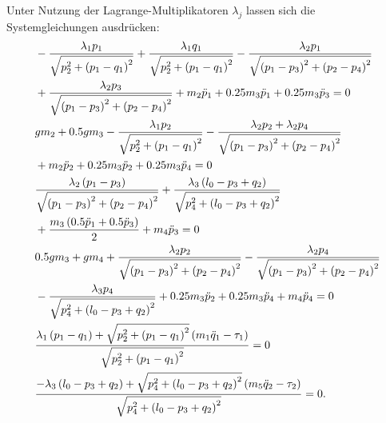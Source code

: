Unter Nutzung der Lagrange-Multiplikatoren $\lambda_j$ lassen sich die Systemgleichungen ausdrücken:
\begin{subequations}
	\begin{flalign}
		&- \frac{\lambda_{1} p_{1}}{\sqrt{p_{2}^{2} + \left(p_{1} - q_{1}\right)^{2}}} + \frac{\lambda_{1} q_{1}}{\sqrt{p_{2}^{2} + \left(p_{1} - q_{1}\right)^{2}}} - \frac{\lambda_{2} p_{1}}{\sqrt{\left(p_{1} - p_{3}\right)^{2} + \left(p_{2} - p_{4}\right)^{2}}} \nonumber \\
		&+ \frac{\lambda_{2} p_{3}}{\sqrt{\left(p_{1} - p_{3}\right)^{2} + \left(p_{2} - p_{4}\right)^{2}}} + m_{2} \ddot{p}_{1} + 0.25 m_{3} \ddot{p}_{1} + 0.25 m_{3} \ddot{p}_{3} = 0\\
		&g m_{2} + 0.5 g m_{3} - \frac{\lambda_{1} p_{2}}{\sqrt{p_{2}^{2} + \left(p_{1} - q_{1}\right)^{2}}} - \frac{\lambda_{2} p_{2} + \lambda_{2} p_{4}}{\sqrt{\left(p_{1} - p_{3}\right)^{2} + \left(p_{2} - p_{4}\right)^{2}}} \nonumber \\
		&+ m_{2} \ddot{p}_{2} + 0.25 m_{3} \ddot{p}_{2} + 0.25 m_{3} \ddot{p}_{4} = 0\\
		&\frac{\lambda_{2} \left(p_{1} - p_{3}\right)}{\sqrt{\left(p_{1} - p_{3}\right)^{2} + \left(p_{2} - p_{4}\right)^{2}}} + \frac{\lambda_{3} \left(l_{0} - p_{3} + q_{2}\right)}{\sqrt{p_{4}^{2} + \left(l_{0} - p_{3} + q_{2}\right)^{2}}} \noindent \\
		&+ \frac{m_{3} \left(0.5 \ddot{p}_{1} + 0.5 \ddot{p}_{3}\right)}{2} + m_{4} \ddot{p}_{3} = 0\\
		&0.5 g m_{3} + g m_{4} + \frac{\lambda_{2} p_{2}}{\sqrt{\left(p_{1} - p_{3}\right)^{2} + \left(p_{2} - p_{4}\right)^{2}}} - \frac{\lambda_{2} p_{4}}{\sqrt{\left(p_{1} - p_{3}\right)^{2} + \left(p_{2} - p_{4}\right)^{2}}} \nonumber \\ 
		&- \frac{\lambda_{3} p_{4}}{\sqrt{p_{4}^{2} + \left(l_{0} - p_{3} + q_{2}\right)^{2}}} + 0.25 m_{3} \ddot{p}_{2} + 0.25 m_{3} \ddot{p}_{4} + m_{4} \ddot{p}_{4} = 0\\
		&\frac{\lambda_{1} \left(p_{1} - q_{1}\right) + \sqrt{p_{2}^{2} + \left(p_{1} - q_{1}\right)^{2}} \left(m_{1} \ddot{q}_{1} - \tau_{1}\right)}{\sqrt{p_{2}^{2} + \left(p_{1} - q_{1}\right)^{2}}} = 0\\
		&\frac{- \lambda_{3} \left(l_{0} - p_{3} + q_{2}\right) + \sqrt{p_{4}^{2} + \left(l_{0} - p_{3} + q_{2}\right)^{2}} \left(m_{5} \ddot{q}_{2} - \tau_{2}\right)}{\sqrt{p_{4}^{2} + \left(l_{0} - p_{3} + q_{2}\right)^{2}}} = 0.
	\end{flalign}
\end{subequations}

